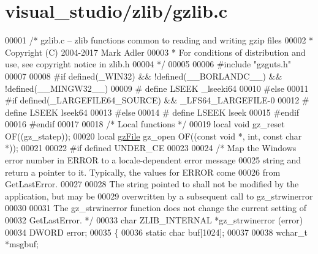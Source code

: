 \hypertarget{visual__studio_2zlib_2gzlib_8c_source}{}\section{visual\+\_\+studio/zlib/gzlib.c}
\label{visual__studio_2zlib_2gzlib_8c_source}

\begin{DoxyCode}
00001 \textcolor{comment}{/* gzlib.c -- zlib functions common to reading and writing gzip files}
00002 \textcolor{comment}{ * Copyright (C) 2004-2017 Mark Adler}
00003 \textcolor{comment}{ * For conditions of distribution and use, see copyright notice in zlib.h}
00004 \textcolor{comment}{ */}
00005 
00006 \textcolor{preprocessor}{#include "gzguts.h"}
00007 
00008 \textcolor{preprocessor}{#if defined(\_WIN32) && !defined(\_\_BORLANDC\_\_) && !defined(\_\_MINGW32\_\_)}
00009 \textcolor{preprocessor}{#  define LSEEK \_lseeki64}
00010 \textcolor{preprocessor}{#else}
00011 \textcolor{preprocessor}{#if defined(\_LARGEFILE64\_SOURCE) && \_LFS64\_LARGEFILE-0}
00012 \textcolor{preprocessor}{#  define LSEEK lseek64}
00013 \textcolor{preprocessor}{#else}
00014 \textcolor{preprocessor}{#  define LSEEK lseek}
00015 \textcolor{preprocessor}{#endif}
00016 \textcolor{preprocessor}{#endif}
00017 
00018 \textcolor{comment}{/* Local functions */}
00019 local \textcolor{keywordtype}{void} gz\_reset OF((gz\_statep));
00020 local \hyperlink{structgz_file__s}{gzFile} gz\_open OF((\textcolor{keyword}{const} \textcolor{keywordtype}{void} *, \textcolor{keywordtype}{int}, \textcolor{keyword}{const} \textcolor{keywordtype}{char} *));
00021 
00022 \textcolor{preprocessor}{#if defined UNDER\_CE}
00023 
00024 \textcolor{comment}{/* Map the Windows error number in ERROR to a locale-dependent error message}
00025 \textcolor{comment}{   string and return a pointer to it.  Typically, the values for ERROR come}
00026 \textcolor{comment}{   from GetLastError.}
00027 \textcolor{comment}{}
00028 \textcolor{comment}{   The string pointed to shall not be modified by the application, but may be}
00029 \textcolor{comment}{   overwritten by a subsequent call to gz\_strwinerror}
00030 \textcolor{comment}{}
00031 \textcolor{comment}{   The gz\_strwinerror function does not change the current setting of}
00032 \textcolor{comment}{   GetLastError. */}
00033 \textcolor{keywordtype}{char} ZLIB\_INTERNAL *gz\_strwinerror (error)
00034      DWORD error;
00035 \{
00036     \textcolor{keyword}{static} \textcolor{keywordtype}{char} buf[1024];
00037 
00038     \textcolor{keywordtype}{wchar\_t} *msgbuf;

\end{DoxyCode}
